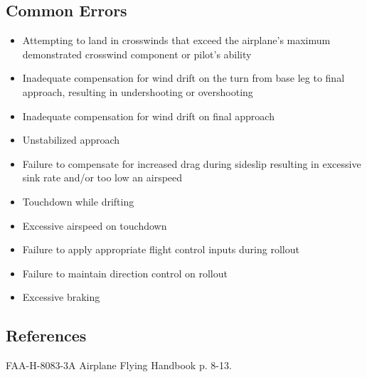 \subsection{Common Errors}

\begin{itemize}
  \item Attempting to land in crosswinds that exceed the airplane's maximum
    demonstrated crosswind component or pilot's ability
  \item Inadequate compensation for wind drift on the turn from base leg to final
    approach, resulting in undershooting or overshooting
  \item Inadequate compensation for wind drift on final approach
  \item Unstabilized approach
  \item Failure to compensate for increased drag during sideslip resulting in
    excessive sink rate and/or too low an airspeed
  \item Touchdown while drifting
  \item Excessive airspeed on touchdown
  \item Failure to apply appropriate flight control inputs during rollout
  \item Failure to maintain direction control on rollout
  \item Excessive braking
\end{itemize}

\subsection{References}

FAA-H-8083-3A Airplane Flying Handbook p. 8-13.

